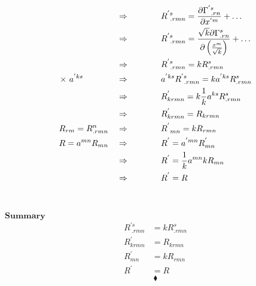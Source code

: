  \begin{align*}
 \Rightarrow \spatie &R^{'s}_{\ .rmn} = \frac{\partial \Gamma^{'s}_{\ .rn}}{\partial x^{'m}} + \dots\\
 \Rightarrow \spatie &R^{'s}_{\ .rmn} = \frac{\sqrt{k}\partial \Gamma^{s}_{.rn}}{\partial \left(\frac{x^{m}}{\sqrt{k}}\right)} + \dots\\
 \Rightarrow \spatie &R^{'s}_{\ .rmn} = k R^{s}_{.rmn}\\
 \times \ a^{'ks}\spatie \Rightarrow \spatie & a^{'ks}R^{'s}_{\ .rmn} = k a^{'ks}R^{s}_{.rmn}\\
 \Rightarrow \spatie &R^{'}_{krmn} = k \frac{1}{k}a^{ks}R^{s}_{.rmn}\\
 \Rightarrow \spatie & R^{'}_{krmn} =R_{krmn}\\
 R_{rm} = R^n_{.rmn} \quad \Rightarrow \spatie &R^{'}_{\ mn} = k R_{rmn}\\
 R = a^{mn}R_{mn} \quad \Rightarrow \spatie &R^{'} = a^{'mn}R^{'}_{mn}\\
 \Rightarrow \spatie  &R^{'} = \frac{1}{k}a^{mn}k R_{mn}\\
 \Rightarrow \spatie  &R^{'} =  R
\end{align*}\\\\
$\mathbf{Summary}$\\
 \begin{align*}
R^{'s}_{\ .rmn} &= k R^{s}_{.rmn}\\
R^{'}_{krmn} &=R_{krmn}\\
R^{'}_{ mn} &= k R_{rmn}\\
R^{'} &=  R
\end{align*}
$$\blacklozenge$$
\newpage





